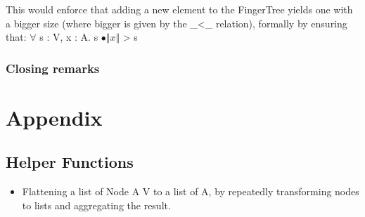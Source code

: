 \documentclass[12pt,twoside,notitlepage]{report}
\begin{document}
\begin{code}
\>[4]\<[6]%
\>[6] \AgdaSymbol{:}     \AgdaBound{>}   \<%
\end{code} 
This would enforce that adding a new element to the FingerTree yields one with a bigger size (where bigger is given by the \_<\_ relation), formally by ensuring that: $\forall$ s : V, x : A. s $∙ \Vert x \Vert$ > s
 
\subsection{Closing remarks}






\chapter{Appendix}

\section{Helper Functions}
\label{app:helper}
\begin{itemize}

\item Flattening a list of Node A V to a list of A, by repeatedly transforming nodes to lists and aggregating the result.\\
\begin{code}
\\
\> \AgdaSymbol{:}  \AgdaSymbol{\{}\AgdaSymbol{\}\{} \AgdaSymbol{:}  \AgdaSymbol{\}\{} \AgdaSymbol{:}   \AgdaSymbol{\}}\<%
\\
\>[6]\<[14]%
\>[14]  \AgdaSymbol{:}   \<%
\\
\>[6]\<[14]%
\>[14]  \AgdaSymbol{:}    \<%
\\
\>[6]\<[14]%
\>[14]  \AgdaSymbol{(}  \AgdaSymbol{)}\<%
\\
\>[6]\<[14]%
\>[14]  \<%
\\
\> \AgdaInductiveConstructor{[]} \AgdaSymbol{=} \AgdaInductiveConstructor{[]}\<%
\\
\> \AgdaSymbol{(}  \AgdaSymbol{)} \AgdaSymbol{=} \AgdaSymbol{(} \AgdaSymbol{)} \AgdaFunction{++} \AgdaSymbol{(} \AgdaSymbol{)}\<%
\\
\end{code}


\end{itemize}
\end{document}
